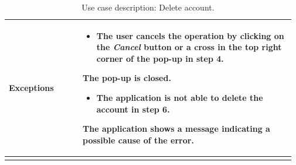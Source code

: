 \begin{longtable}{@{}p{0.25\linewidth} p{0.72\linewidth}@{}}
	\textbf{Exceptions}         & \begin{itemize}[leftmargin=.4cm,noitemsep,topsep=0pt,before=\vspace{-3mm}]
	   \item The user cancels the operation by clicking on the \textit{Cancel} button or a cross in the top right corner of the pop-up in step 4.
	\end{itemize}
	The pop-up is closed.
    \begin{itemize}[leftmargin=.4cm,noitemsep,topsep=0pt]
	   \item The application is not able to delete the account in step 6.
	\end{itemize}
	The application shows a message indicating a possible cause of the error.
	\\\bottomrule
	\caption{Use case description: Delete account.} 
\end{longtable}

